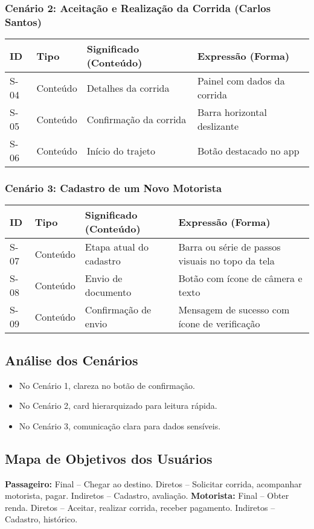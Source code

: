 \documentclass[12pt,a4paper]{article}
\begin{document}
\subsubsection{Cenário 2: Aceitação e Realização da Corrida (Carlos Santos)}

\begin{longtable}{|p{1.5cm}|p{2.5cm}|p{5cm}|p{5cm}|}
\hline
\textbf{ID} & \textbf{Tipo} & \textbf{Significado (Conteúdo)} & \textbf{Expressão (Forma)} \\
\hline
S-04 & Conteúdo & Detalhes da corrida & Painel com dados da corrida \\
\hline
S-05 & Conteúdo & Confirmação da corrida & Barra horizontal deslizante \\
\hline
S-06 & Conteúdo & Início do trajeto & Botão destacado no app \\
\hline
\end{longtable}

\subsubsection{Cenário 3: Cadastro de um Novo Motorista}

\begin{longtable}{|p{1.5cm}|p{2.5cm}|p{5cm}|p{5cm}|}
\hline
\textbf{ID} & \textbf{Tipo} & \textbf{Significado (Conteúdo)} & \textbf{Expressão (Forma)} \\
\hline
S-07 & Conteúdo & Etapa atual do cadastro & Barra ou série de passos visuais no topo da tela \\
\hline
S-08 & Conteúdo & Envio de documento & Botão com ícone de câmera e texto \\
\hline
S-09 & Conteúdo & Confirmação de envio & Mensagem de sucesso com ícone de verificação \\
\hline
\end{longtable}

\subsection{Análise dos Cenários}
\begin{itemize}
    \item No Cenário 1, clareza no botão de confirmação.
    \item No Cenário 2, card hierarquizado para leitura rápida.
    \item No Cenário 3, comunicação clara para dados sensíveis.
\end{itemize}

\subsection{Mapa de Objetivos dos Usuários}
\textbf{Passageiro:} Final – Chegar ao destino. Diretos – Solicitar corrida, acompanhar motorista, pagar. Indiretos – Cadastro, avaliação.
\textbf{Motorista:} Final – Obter renda. Diretos – Aceitar, realizar corrida, receber pagamento. Indiretos – Cadastro, histórico.
\end{document}
